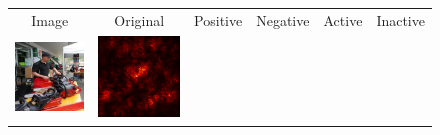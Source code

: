 \documentclass[preprint,12pt]{elsarticle}
\begin{document}
\begin{figure}[p]
  \centering
  \footnotesize
  \newcommand{\scale}{0.25}
  \setlength{\tabcolsep}{2pt}
  \begin{tabular}{cccccc}
  Image & Original & Positive & Negative & Active & Inactive \\
  
  \includegraphics[scale=\scale]{../visualizations/examples/imagenette/cnn/images/0.png} &
  \includegraphics[scale=\scale]{../visualizations/examples/imagenette/cnn/saliency_map/0.png} & 

\end{tabular}
\end{figure}
\end{document}
